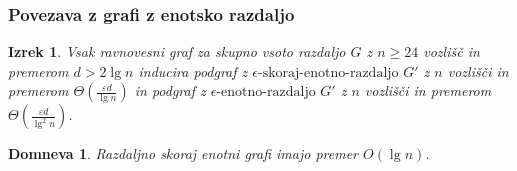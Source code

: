 \documentclass[12pt, hyperref={unicode}]{beamer}
\newtheorem{izrek}{Izrek}
\newtheorem{domneva}{Domneva}
\begin{document}
\begin{frame}

  \frametitle{Povezava z grafi z enotsko razdaljo}
  \begin{izrek}
    Vsak ravnovesni graf za skupno vsoto razdaljo $G$ z $n \geq 24$ vozlišč in
    premerom $d > 2 \lg n$ inducira podgraf z $\epsilon\text{-skoraj-enotno-razdaljo } G'$
    z $n$ vozlišči in premerom $\Theta\left(\frac{\varepsilon d}{\lg n}\right)$ in
    podgraf z $\epsilon\text{-enotno-razdaljo } G'$ z $n$ vozlišči in premerom
    $\Theta\left(\frac{\varepsilon d}{\lg^2 n}\right)$.
  \end{izrek}

  \begin{domneva}
    Razdaljno skoraj enotni grafi imajo premer $O(\lg n)$.
  \end{domneva}


\end{frame}
\end{document}

